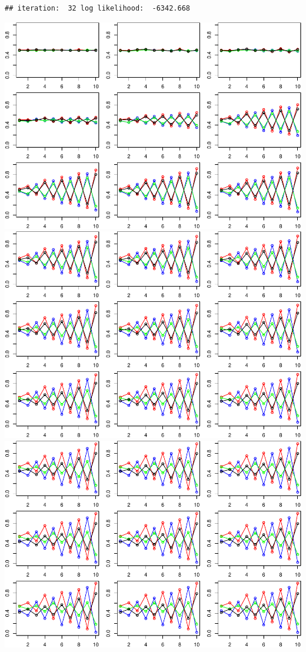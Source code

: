 \documentclass[
]{article}
\begin{document}
\begin{verbatim}
## iteration:  32 log likelihood:  -6342.668
\end{verbatim}

\includegraphics{MLLab1block2-lepeng_files/figure-latex/Assignment2_7-1.pdf}
\includegraphics{MLLab1block2-lepeng_files/figure-latex/Assignment2_7-2.pdf}
\includegraphics{MLLab1block2-lepeng_files/figure-latex/Assignment2_7-3.pdf}
\end{document}
